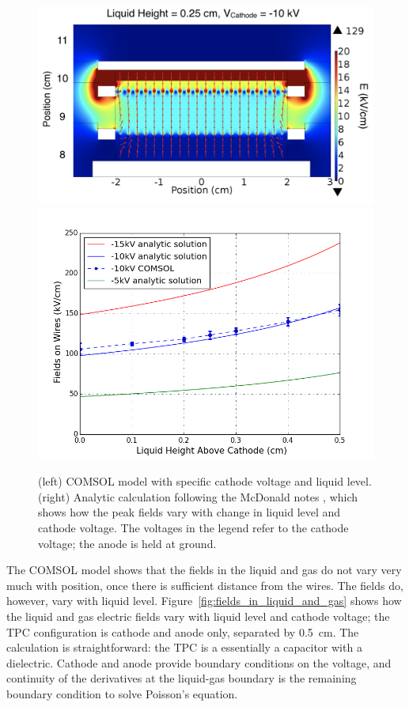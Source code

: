 \begin{figure}[htbp]
\begin{center}
\includegraphics[width=\halffig]{figures/testbed/COMSOL.png}
\includegraphics[width=\halffig]{figures/testbed/FieldsOnWires_withCOMSOL.png}
\caption{(left) COMSOL model with specific cathode voltage and liquid level. (right) Analytic calculation following the McDonald notes \cite{McDonald2003}, which shows how the peak fields vary with change in liquid level and cathode voltage. The voltages in the legend refer to the cathode voltage; the anode is held at ground.}
\label{fig:fields_on_wires}
\end{center}
\end{figure}

The COMSOL model shows that the fields in the liquid and gas do not vary very much with position, once there is sufficient distance from the wires. The fields do, however, vary with liquid level. Figure~\ref{fig:fields_in_liquid_and_gas} shows how the liquid and gas electric fields vary with liquid level and cathode voltage; the \ac{TPC} configuration is cathode and anode only, separated by 0.5~cm. The calculation is straightforward: the \ac{TPC} is a essentially a capacitor with a dielectric. Cathode and anode provide boundary conditions on the voltage, and continuity of the derivatives at the liquid-gas boundary is the remaining boundary condition to solve Poisson's equation.


